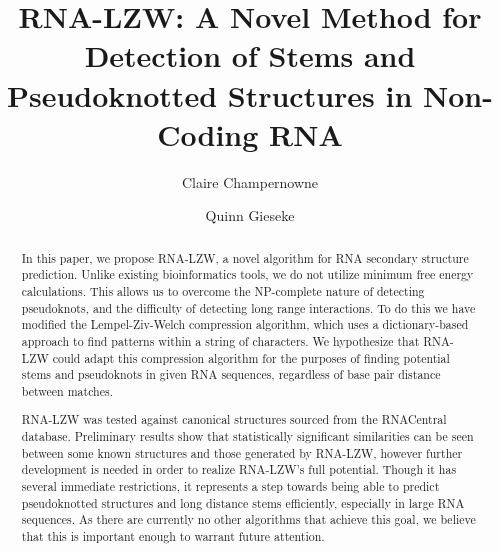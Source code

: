 \documentclass[sigconf]{acmart}
\begin{document}
\title{RNA-LZW: A Novel Method for Detection of Stems and Pseudoknotted Structures in Non-Coding RNA}

\author{Claire Champernowne}

\author{Quinn Gieseke}

\renewcommand{\shortauthors}{Champernowne and Gieseke, et al.}

\begin{abstract}
In this paper, we propose RNA-LZW, a novel algorithm for RNA secondary structure prediction. Unlike existing bioinformatics tools, we do not utilize minimum free energy calculations. This allows us to overcome the NP-complete nature of detecting pseudoknots, and the difficulty of detecting long range interactions. To do this we have modified the Lempel-Ziv-Welch compression algorithm, which  uses a dictionary-based approach to find patterns within a string of characters. We hypothesize that RNA-LZW could adapt this compression algorithm for the purposes of finding potential stems and pseudoknots in given RNA sequences, regardless of base pair distance between matches. 

RNA-LZW was tested against canonical structures sourced from the RNACentral database. Preliminary results show that statistically significant similarities can be seen between some known structures and those generated by RNA-LZW, however further development is needed in order to realize RNA-LZW's full potential. Though it has several immediate restrictions, it represents a step towards being able to predict pseudoknotted structures and long distance stems efficiently, especially in large RNA sequences. As there are currently no other algorithms that achieve this goal, we believe that this is important enough to warrant future attention. 
\end{abstract}


\maketitle
\end{document}

